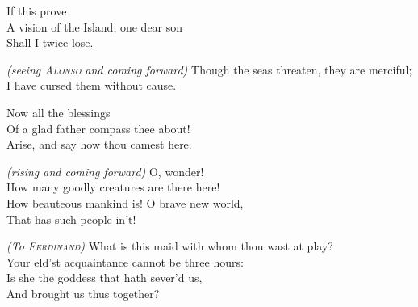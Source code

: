 \begin{verse_speech}[Alonso] 
If this prove\\
A vision of the Island, one dear son\\
Shall I twice lose.
\end{verse_speech}


\begin{verse_speech}[Ferdinand] 
	\textit{(seeing \textsc{Alonso} and coming forward)}
Though the seas threaten, they are merciful;\\
I have cursed them without cause.
\end{verse_speech}


\begin{verse_speech}[Alonso] 
Now all the blessings\\
Of a glad father compass thee about!\\
Arise, and say how thou camest here.
\end{verse_speech}


\begin{verse_speech}[Miranda] 
\textit{(rising and coming forward)} O, wonder!\\
How many goodly creatures are there here!\\
How beauteous mankind is! O brave new world,\\
That has such people in't!
\end{verse_speech}


\begin{verse_speech}[Alonso] 
\textit{(To \textsc{Ferdinand})} What is this maid with whom thou wast at play?\\
Your eld'st acquaintance cannot be three hours:\\
Is she the goddess that hath sever'd us,\\
And brought us thus together?
\end{verse_speech}

